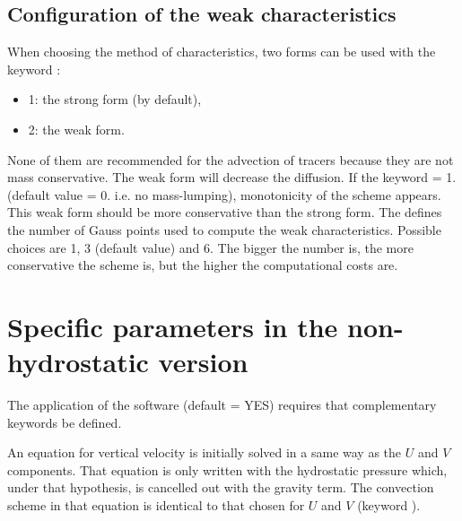 \subsection{Configuration of the weak characteristics}

When choosing the method of characteristics, two forms can be used with the
keyword :

\begin{itemize}
\item 1: the strong form (by default),

\item 2: the weak form.
\end{itemize}

None of them are recommended for the advection of tracers because they are not
mass conservative. The weak form will decrease the diffusion. If the keyword
 = 1. (default value = 0. i.e. no
mass-lumping), monotonicity of the scheme appears. This weak form should be
more conservative than the strong form. The  defines the number of Gauss points used to compute the
weak characteristics. Possible choices are 1, 3 (default value) and 6. The
bigger the number is, the more conservative the scheme is, but the higher the
computational costs are.


\section{Specific parameters in the non-hydrostatic version}

The application of the software  (default = YES)
requires that complementary keywords be defined.

An equation for vertical velocity is initially solved in a same way as the
$U$ and $V$ components. That equation is only written with the
hydrostatic pressure which, under that hypothesis, is cancelled out with the
gravity term. The convection scheme in that equation is identical to that
chosen for $U$ and $V$ (keyword ).
%
%
%
%

